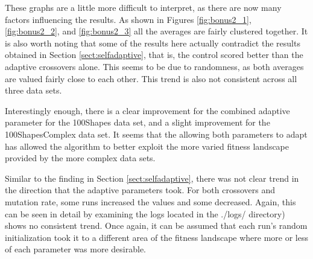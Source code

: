 \documentclass[11pt]{article}
\begin{document}
These graphs are a little more difficult to interpret, as there are now many factors influencing the results. As shown in Figures \ref{fig:bonus2_1}, \ref{fig:bonus2_2}, and \ref{fig:bonus2_3} all the averages are fairly clustered together. It is also worth noting that some of the results here actually contradict the results obtained in Section \ref{sect:selfadaptive}, that is, the control scored better than the adaptive crossovers alone. This seems to be due to randomness, as both averages are valued fairly close to each other. This trend is also not consistent across all three data sets.

Interestingly enough, there is a clear improvement for the combined adaptive parameter for the 100Shapes data set, and a slight improvement for the 100ShapesComplex data set. It seems that the allowing both parameters to adapt has allowed the algorithm to better exploit the more varied fitness landscape provided by the more complex data sets.

Similar to the finding in Section \ref{sect:selfadaptive}, there was not clear trend in the direction that the adaptive parameters took. For both crossovers and mutation rate, some runs increased the values and some decreased. Again, this can be seen in detail by examining the logs located in the ./logs/ directory) shows no consistent trend. Once again, it can be assumed that each run's random initialization took it to a different area of the fitness landscape where more or less of each parameter was more desirable.
\end{document}
